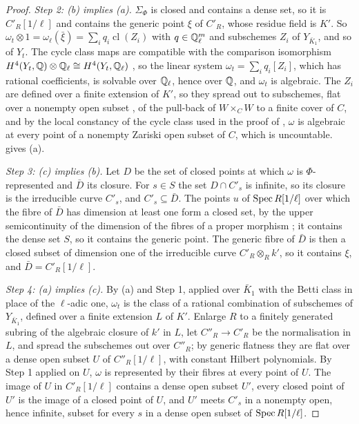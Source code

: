 \begin{proof}
\emph{Step 2: (b) implies (a).} $\Sigma_{\Phi}$ is closed and contains a dense
set, so it is $C'_{R}[1/\ell]$ and contains the generic point $\xi$ of
$C'_{R}$, whose residue field is $K'$. So $\omega_{t}\otimes1=
\omega_{\ell}(\bar\xi)=\sum_{i}q_{i}\operatorname{cl}(Z_{i})$ with
$q\in\mathbb{Q}_{\ell}^{m}$ and subschemes $Z_{i}$ of $Y_{\bar{K}_{1}}$, and so of
$Y_{t}$. The cycle class maps are compatible with the comparison isomorphism
$H^{4}(Y_{t},\mathbb{Q})\otimes\mathbb{Q}_{\ell}\cong H^{4}(Y_{t},\mathbb{Q}_{\ell})$
\cite[Section~1 and Example~2.1(a)]{Del82}, so the linear system
$\omega_{t}=\sum_{i}q_{i}[Z_{i}]$, which has rational coefficients, is
solvable over $\mathbb{Q}_{\ell}$, hence over $\mathbb{Q}$, and $\omega_{t}$ is algebraic.
The $Z_{i}$ are defined over a finite extension of $K'$, so they spread out to
subschemes, flat over a nonempty open subset \cite[Tag~052A]{Stacks}, of the
pull-back of $W\times_{C}W$ to a finite cover of $C$, and by the local
constancy of the cycle class used in the proof of ,
$\omega$ is algebraic at every point of a nonempty Zariski open subset of $C$,
which is uncountable.  gives (a).

\emph{Step 3: (c) implies (b).} Let $D$ be the set of closed points at which
$\omega$ is $\Phi$-represented and $\bar{D}$ its closure. For $s\in S$ the set
$D\cap C'_{s}$ is infinite, so its closure is the irreducible curve $C'_{s}$,
and $C'_{s}\subseteq\bar{D}$. The points $u$ of $\operatorname{Spec} R[1/\ell]$ over which
the fibre of $\bar{D}$ has dimension at least one form a closed set, by the
upper semicontinuity of the dimension of the fibres of a proper morphism
\cite[Tag~0D4I]{Stacks}; it contains the dense set $S$, so it contains the
generic point. The generic fibre of $\bar{D}$ is then a closed subset of
dimension one of the irreducible curve $C'_{R}\otimes_{R}k'$, so it contains
$\xi$, and $\bar{D}=C'_{R}[1/\ell]$.

\emph{Step 4: (a) implies (c).} By (a) and Step 1, applied over $\bar{K}_{1}$
with the Betti class in place of the $\ell$-adic one, $\omega_{t}$ is the
class of a rational combination of subschemes of $Y_{\bar{K}_{1}}$, defined
over a finite extension $L$ of $K'$. Enlarge $R$ to a finitely generated
subring of the algebraic closure of $k'$ in $L$, let $C''_{R}\to C'_{R}$ be the
normalisation in $L$, and spread the subschemes out over $C''_{R}$; by generic
flatness \cite[Tag~052A]{Stacks} they are flat over a dense open subset $U$ of
$C''_{R}[1/\ell]$, with constant Hilbert polynomials. By Step 1 applied on $U$,
$\omega$ is represented by their fibres at every point of $U$. The image of $U$
in $C'_{R}[1/\ell]$ contains a dense open subset $U'$, every closed point of
$U'$ is the image of a closed point of $U$, and $U'$ meets $C'_{s}$ in a
nonempty open, hence infinite, subset for every $s$ in a dense open subset of
$\operatorname{Spec} R[1/\ell]$.


\end{proof}
